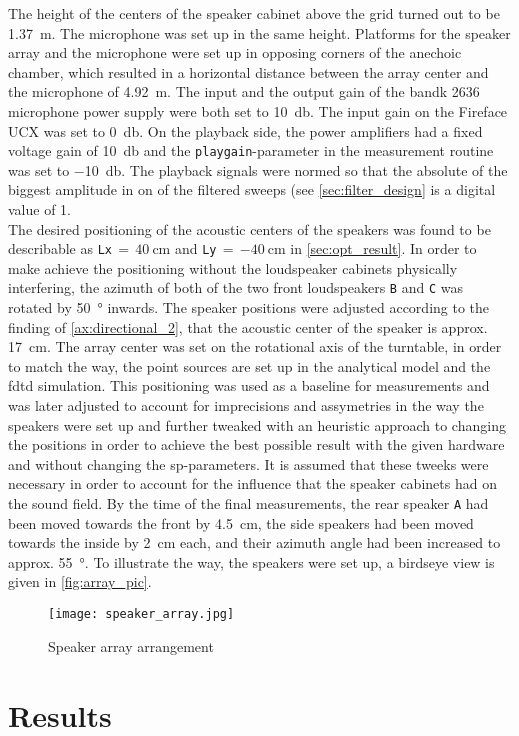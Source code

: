 The height of the centers of the speaker cabinet above the grid turned out to be \SI{1.37}{\meter}. The microphone was set up in the same height. Platforms for the speaker array and the microphone were set up in opposing corners of the anechoic chamber, which resulted in a horizontal distance between the array center and the microphone of \SI{4.92}{\meter}.
The input and the output gain of the \gls{bandk} 2636 microphone power supply were both set to \SI{+10}{\decibel}. The input gain on the Fireface UCX was set to \SI{0}{\decibel}. On the playback side, the power amplifiers had a fixed voltage gain of \SI{+10}{\decibel} and the \texttt{playgain}-parameter in the measurement routine was set to \SI{-10}{\decibel}. The playback signals were normed so that the absolute of the biggest amplitude in on of the filtered sweeps (see \autoref{sec:filter_design} is a digital value of 1.\\
The desired positioning of the acoustic centers of the speakers was found to be describable as \texttt{Lx}$\,=\,\SI{40}{\centi\meter}$ and \texttt{Ly}$\,=\,\SI{-40}{\centi\meter}$ in \autoref{sec:opt_result}. In order to make achieve the positioning without the loudspeaker cabinets physically interfering, the azimuth of both of the two front loudspeakers \texttt{B} and \texttt{C} was rotated by \SI{50}{\degree} inwards. The speaker positions were adjusted according to the finding of \autoref{ax:directional_2}, that the acoustic center of the speaker is approx. \SI{17}{\centi\meter}. The array center was set on the rotational axis of the turntable, in order to match the way, the point sources are set up in the analytical model and the \gls{fdtd} simulation.
This positioning was used as a baseline for measurements and was later adjusted to account for imprecisions and assymetries in the way the speakers were set up and further tweaked with an heuristic approach to changing the positions in order to achieve the best possible result with the given hardware and without changing the \gls{sp}-parameters. It is assumed that these tweeks were necessary in order to account for the influence that the speaker cabinets had on the sound field. By the time of the final measurements, the rear speaker \texttt{A} had been moved towards the front by \SI{4.5}{\centi\meter}, the side speakers had been moved towards the inside by \SI{2}{\centi\meter} each, and their azimuth angle had been increased to approx. \SI{55}{\degree}.
To illustrate the way, the speakers were set up, a birdseye view is given in \autoref{fig:array_pic}.
\begin{figure}[h]\label{fig:array_pic}
	\centering
    \texttt{[image: speaker\_array.jpg]}
    \caption{Speaker array arrangement}
\end{figure}

\section*{Results}